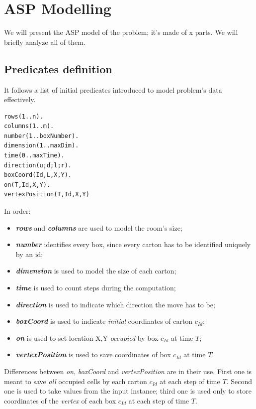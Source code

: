 \documentclass[headinclude, footinclude, abstract=on]{scrarticle}
\begin{document}
\section{ASP Modelling}
We will present the ASP model of the problem; it's made of x parts. We will briefly analyze all of them.

\subsection{Predicates definition}
It follows a list of initial predicates introduced to model problem's data effectively.
\begin{verbatim}
rows(1..n).
columns(1..m).
number(1..boxNumber).  
dimension(1..maxDim).
time(0..maxTime).   
direction(u;d;l;r). 
boxCoord(Id,L,X,Y).
on(T,Id,X,Y).
vertexPosition(T,Id,X,Y)
\end{verbatim}
In order:
\begin{itemize}
    \item \textbf{\textit{rows}} and \textbf{\textit{columns}} are used to model the room's size;
    \item \textbf{\textit{number}} identifies every box, since every carton has to be identified uniquely by an id;
    \item \textbf{\textit{dimension}} is used to model the size of each carton;
    \item \textbf{\textit{time}} is used to count steps during the computation;
    \item \textbf{\textit{direction}} is used to indicate which direction the move has to be;
    \item \textbf{\textit{boxCoord}} is used to indicate \textit{initial} coordinates of carton $c_{Id}$;
    \item \textbf{\textit{on}} is used to set location X,Y \textit{occupied} by box $c_{Id}$ at time $T$;
    \item \textbf{\textit{vertexPosition}} is used to save coordinates of box $c_{Id}$ at time $T$. 
\end{itemize}
Differences between \textit{on}, \textit{boxCoord} and  \textit{vertexPosition} are in their use. First one is meant to save \textit{all} occupied cells by each carton $c_{Id}$ at each step of time $T$. Second one is used to take values from the input instance; third one is used only to store coordinates of the \textit{vertex} of each box $c_{Id}$ at each step of time $T$.
\end{document}

